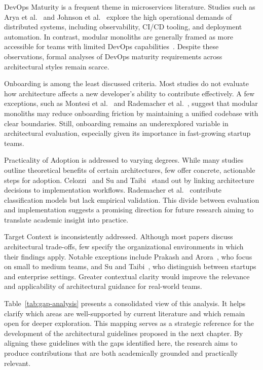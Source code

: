 DevOps Maturity is a frequent theme in microservices literature. Studies such as Arya et al.~\cite{arya2024beyond} and Johnson et al.~\cite{johnson2024serviceweaver} explore the high operational demands of distributed systems, including observability, CI/CD tooling, and deployment automation. In contrast, modular monoliths are generally framed as more accessible for teams with limited DevOps capabilities~\cite{montesi2021sliceable, celozzi2020}. Despite these observations, formal analyses of DevOps maturity requirements across architectural styles remain scarce.

Onboarding is among the least discussed criteria. Most studies do not evaluate how architecture affects a new developer’s ability to contribute effectively. A few exceptions, such as Montesi et al.~\cite{montesi2021sliceable} and Rademacher et al.~\cite{tsechelidis2023modular}, suggest that modular monoliths may reduce onboarding friction by maintaining a unified codebase with clear boundaries. Still, onboarding remains an underexplored variable in architectural evaluation, especially given its importance in fast-growing startup teams.

Practicality of Adoption is addressed to varying degrees. While many studies outline theoretical benefits of certain architectures, few offer concrete, actionable steps for adoption. Celozzi~\cite{celozzi2020} and Su and Taibi~\cite{su2024from} stand out by linking architecture decisions to implementation workflows. Rademacher et al.~\cite{tsechelidis2023modular} contribute classification models but lack empirical validation. This divide between evaluation and implementation suggests a promising direction for future research aiming to translate academic insight into practice.

Target Context is inconsistently addressed. Although most papers discuss architectural trade-offs, few specify the organizational environments in which their findings apply. Notable exceptions include Prakash and Arora~\cite{prakash2024systematic}, who focus on small to medium teams, and Su and Taibi~\cite{su2024from}, who distinguish between startups and enterprise settings. Greater contextual clarity would improve the relevance and applicability of architectural guidance for real-world teams.



Table~\ref{tab:gap-analysis} presents a consolidated view of this analysis. It helps clarify which areas are well-supported by current literature and which remain open for deeper exploration. This mapping serves as a strategic reference for the development of the architectural guidelines proposed in the next chapter. By aligning these guidelines with the gaps identified here, the research aims to produce contributions that are both academically grounded and practically relevant.

